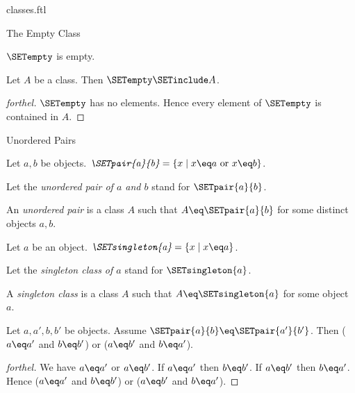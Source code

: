 \documentclass{naproche-library}
\begin{document}
\begin{smodule}[title=Classes]{classes.ftl}
\begin{sfragment}{The Empty Class}
  \begin{corollary}[forthel,id=FOUNDATIONS_01_1495141426659328]
    $\SETempty$ is empty.
  \end{corollary}

  \begin{corollary}[forthel,id=FOUNDATIONS_01_6931785090859008]
    Let $A$ be a class.
    Then $\SETempty \SETinclude A$.
  \end{corollary}
  \begin{proof}[forthel]
    $\SETempty$ has no elements.
    Hence every element of $\SETempty$ is contained in $A$.
  \end{proof}
\end{sfragment}

\begin{sfragment}{Unordered Pairs}
  \begin{definition}[forthel,id=FOUNDATIONS_01_3471035364016128]
    Let $a, b$ be objects.
    $\emph{\SETpair{a}{b}} = \{ x \mid x \eq a\text{ or }x \eq b \}$.

    Let the \emph{unordered pair of $a$ and $b$} stand for $\SETpair{a}{b}$.
  \end{definition}


  \begin{definition}[forthel,id=FOUNDATIONS_01_605432672419840]
    An \emph{unordered pair} is a class $A$ such that $A \eq \SETpair{a}{b}$ for some distinct objects $a, b$.
  \end{definition}

  \begin{definition}[forthel,id=FOUNDATIONS_01_1160414603771904]
    Let $a$ be an object.
    $\emph{\SETsingleton{a}} = \{ x \mid x \eq a \}$.

    Let the \emph{singleton class of $a$} stand for $\SETsingleton{a}$.
  \end{definition}


  \begin{definition}[forthel,id=FOUNDATIONS_01_6786618161627136]
    A \emph{singleton class} is a class $A$ such that $A \eq \SETsingleton{a}$ for some object $a$.
  \end{definition}

  \begin{proposition}[forthel,id=FOUNDATIONS_01_6125259604361216]
    Let $a, a', b, b'$ be objects.
    Assume $\SETpair{a}{b} \eq \SETpair{a'}{b'}$.
    Then ($a \eq a'$ and $b \eq b'$) or ($a \eq b'$ and $b \eq a'$).
  \end{proposition}
  \begin{proof}[forthel]
    We have $a \eq a'$ or $a \eq b'$.
    If $a \eq a'$ then $b \eq b'$.
    If $a \eq b'$ then $b \eq a'$.
    Hence ($a \eq a'$ and $b \eq b'$) or ($a \eq b'$ and $b \eq a'$).
  \end{proof}


\end{sfragment}
\end{smodule}
\end{document}
